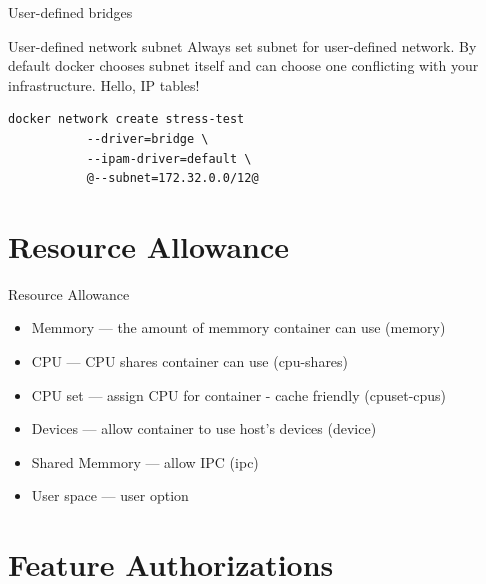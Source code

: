 \begin{frame}[fragile]{User-defined bridges}  
  \begin{alertblock}{User-defined network subnet}
    Always set subnet for user-defined network. By default docker chooses subnet itself and can choose one conflicting with your infrastructure. Hello, IP tables!
  \end{alertblock} 
  \begin{lstlisting}[basicstyle=\ttfamily\small\color{myblue}]
    docker network create stress-test
           --driver=bridge \
           --ipam-driver=default \
           @--subnet=172.32.0.0/12@
  \end{lstlisting}    
\end{frame}

\section{Resource Allowance}

\begin{frame}{Resource Allowance}
  \begin{itemize}
    \item Memmory --- the amount of memmory container can use (memory)
    \item CPU     --- CPU shares container can use (cpu-shares)
    \item CPU set --- assign CPU for container - cache friendly (cpuset-cpus)
    \item Devices --- allow container to use host's devices (device)
    \item Shared Memmory --- allow IPC (ipc)  
    \item User space --- user option
  \end{itemize}
\end{frame}

\section{Feature Authorizations}

